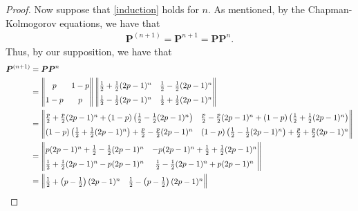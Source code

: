 \begin{proof}
  Now suppose that \eqref{induction} holds for $n$. As mentioned, by the Chapman-Kolmogorov equations,
  we have that
  \begin{align*}
    \boldsymbol{P}^{(n+1)} = \boldsymbol{P}^{n+1} = \boldsymbol{P}\boldsymbol{P}^n.
  \end{align*}
  Thus, by our supposition, we have that
  \begin{align*}
    \boldsymbol{P}^{(n+1)} &= \boldsymbol{P}\boldsymbol{P}^n \\
    &=
    \renewcommand\arraystretch{1.5}
    \begin{Vmatrix}
      p    & 1-p \\
      1-p  & p   \\
    \end{Vmatrix}
    \begin{Vmatrix}
      \frac{1}{2} + \frac{1}{2}(2p - 1)^n & \frac{1}{2} - \frac{1}{2}(2p - 1)^n  \\
      \frac{1}{2} - \frac{1}{2}(2p - 1)^n & \frac{1}{2} + \frac{1}{2}(2p - 1)^n \\
    \end{Vmatrix} \\
    &=
    \renewcommand\arraystretch{1.5}
    \begin{Vmatrix}
      \frac{p}{2} + \frac{p}{2}(2p - 1)^n + (1-p)\left(\frac{1}{2} - \frac{1}{2}(2p - 1)^n\right) & \frac{p}{2} - \frac{p}{2}(2p - 1)^n + (1-p)\left(\frac{1}{2} + \frac{1}{2}(2p - 1)^n\right)  \\
      (1-p)\left(\frac{1}{2} + \frac{1}{2}(2p - 1)^n\right) + \frac{p}{2} - \frac{p}{2}(2p - 1)^n & (1-p)\left(\frac{1}{2} - \frac{1}{2}(2p - 1)^n\right) + \frac{p}{2} + \frac{p}{2}(2p - 1)^n\\
    \end{Vmatrix} \\
    &=
    \renewcommand\arraystretch{1.5}
    \begin{Vmatrix}
      p(2p - 1)^n + \frac{1}{2} - \frac{1}{2}(2p - 1)^n & -p(2p - 1)^n + \frac{1}{2} + \frac{1}{2}(2p - 1)^n \\
      \frac{1}{2} + \frac{1}{2}(2p - 1)^n - p(2p - 1)^n & \frac{1}{2} - \frac{1}{2}(2p - 1)^n + p(2p - 1)^n \\
    \end{Vmatrix} \\
    &=
    \renewcommand\arraystretch{1.5}
    \begin{Vmatrix}
      \frac{1}{2} + \left(p - \frac{1}{2}\right)(2p - 1)^n & \frac{1}{2} - \left(p - \frac{1}{2}\right)(2p - 1)^n \\

\end{Vmatrix}
\end{align*}
\end{proof}
